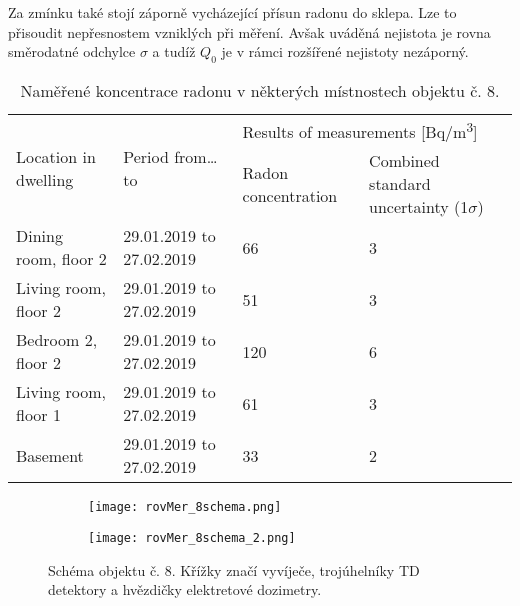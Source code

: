 Za zmínku také stojí záporně vycházející přísun radonu do sklepa. Lze to přisoudit nepřesnostem vzniklých při měření. Avšak uváděná nejistota je rovna směrodatné odchylce $\sigma$ a tudíž $Q_0$ je v rámci rozšířené nejistoty nezáporný.
\shorthandoff{-}
\begin{table}[ht]
	\centering
	\caption{Naměřené koncentrace radonu v některých místnostech objektu č. 8. \cite{rovMer_8Rn}}
	\label{tab:rovMer_8diskuze}
	\begin{tabular}{llp{2cm}p{3cm}}
		\toprule
		\multirow{2}{*}{Location in dwelling} & \multirow{2}{*}{Period from\ldots to}  & \multicolumn{2}{l}{Results of measurements [\si{Bq/m^3}]} \\
		\cline{3-4}
		&   & Radon concentration   & Combined standard uncertainty (1$\sigma$)   \\
		\midrule
		Dining room, floor 2    & 29.01.2019 to 27.02.2019 & 66 & 3  \\
		Living room,   floor 2 & 29.01.2019   to 27.02.2019 & 51  & 3 \\
		Bedroom 2, floor 2& 29.01.2019   to 27.02.2019 & 120  & 6   \\
		Living room, floor 1 &29.01.2019   to 27.02.2019 & 61 & 3  \\
		Basement   & 29.01.2019   to 27.02.2019 & 33  & 2 \\
		\bottomrule
	\end{tabular}
\end{table}
\shorthandon{-}
\begin{figure}[ht]
    \centering
    \begin{subfigure}{.49\textwidth}
        \texttt{[image: rovMer\_8schema.png]}
    \end{subfigure}
    \begin{subfigure}{.49\textwidth}
        \texttt{[image: rovMer\_8schema\_2.png]}
    \end{subfigure}
    \caption{Schéma objektu č. 8. Křížky značí vyvíječe, trojúhelníky TD detektory a hvězdičky elektretové dozimetry. \cite{rovMer_8Rn}}
    \label{fig:rovMer_8schema}
\end{figure}
